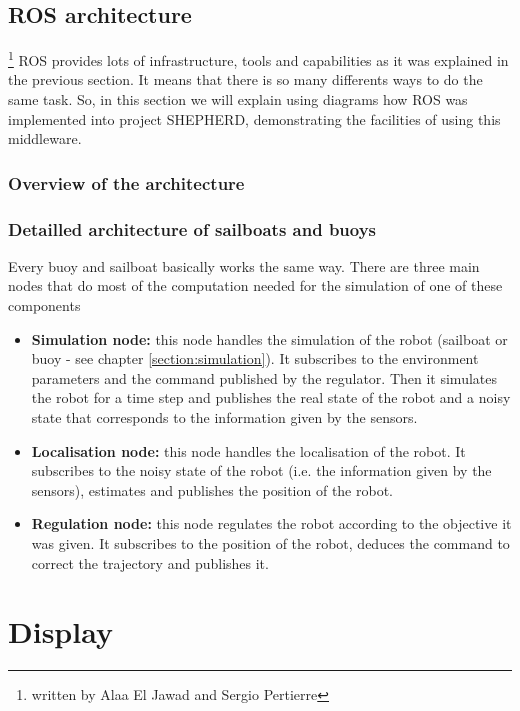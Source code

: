 \documentclass[a4paper]{report}
\begin{document}
\section{ROS architecture}
	\footnote{written by Alaa El Jawad and Sergio Pertierre}  
ROS provides lots of infrastructure, tools and capabilities as it was explained in the previous section. It means that there is so many differents ways to do the same task. So, in this section we will explain using diagrams how ROS was implemented into project SHEPHERD, demonstrating the facilities of using this middleware.
\subsection{Overview of the architecture}

\subsection{Detailled architecture of sailboats and buoys}

Every buoy and sailboat basically works the same way. There are three main nodes that do most of the computation needed for the simulation of one of these components
    
    \begin{itemize}
    \item \textbf{Simulation node:} this node handles the simulation of the robot (sailboat or buoy - see chapter \ref{section:simulation}). It subscribes to the environment parameters and the command published by the regulator. Then it simulates the robot for a time step and publishes the real state of the robot and a noisy state that corresponds to the information given by the sensors.
    \item \textbf{Localisation node:} this node handles the localisation of the robot. It subscribes to the noisy state of the robot (i.e. the information given by the sensors), estimates and publishes the position of the robot.
    \item \textbf{Regulation node:} this node regulates the robot according to the objective it was given. It subscribes to the position of the robot, deduces the command to correct the trajectory and publishes it.
    
    

    \end{itemize}
\chapter{Display}
\end{document}
